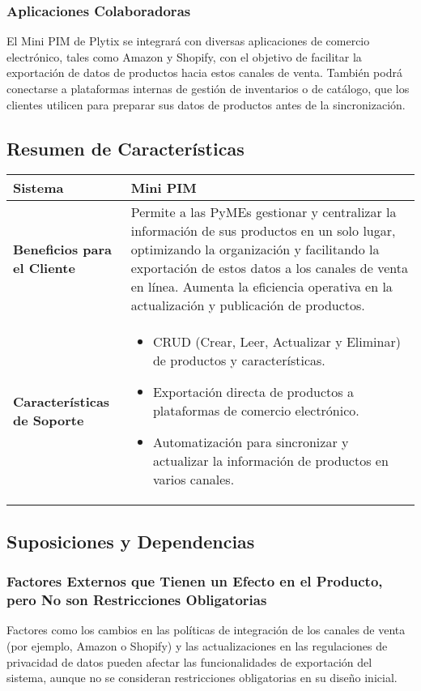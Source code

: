 \documentclass{article}
\begin{document}
\subsubsection{Aplicaciones Colaboradoras}
El Mini PIM de Plytix se integrará con diversas aplicaciones de comercio electrónico, tales como Amazon y Shopify, con el objetivo de facilitar la exportación de datos de productos hacia estos canales de venta. También podrá conectarse a plataformas internas de gestión de inventarios o de catálogo, que los clientes utilicen para preparar sus datos de productos antes de la sincronización.

\subsection{Resumen de Características}

\begin{table}[h!]
\centering
\begin{tabular}{|l|p{10cm}|}
    \hline
    \textbf{Sistema} & Mini PIM \\
    \hline
    \textbf{Beneficios para el Cliente} & Permite a las PyMEs gestionar y centralizar la información de sus productos en un solo lugar, optimizando la organización y facilitando la exportación de estos datos a los canales de venta en línea. Aumenta la eficiencia operativa en la actualización y publicación de productos. \\
    \hline
    \textbf{Características de Soporte} & 
    \begin{itemize}
        \item CRUD (Crear, Leer, Actualizar y Eliminar) de productos y características.
        \item Exportación directa de productos a plataformas de comercio electrónico.
        \item Automatización para sincronizar y actualizar la información de productos en varios canales.
    \end{itemize} \\
    \hline
\end{tabular}
\end{table}

\subsection{Suposiciones y Dependencias}

\subsubsection{Factores Externos que Tienen un Efecto en el Producto, pero No son Restricciones Obligatorias}
Factores como los cambios en las políticas de integración de los canales de venta (por ejemplo, Amazon o Shopify) y las actualizaciones en las regulaciones de privacidad de datos pueden afectar las funcionalidades de exportación del sistema, aunque no se consideran restricciones obligatorias en su diseño inicial.
\end{document}
